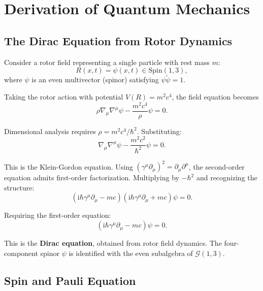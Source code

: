 \documentclass[11pt,a4paper]{article}
\numberwithin{equation}{section}
\theoremstyle{plain}
\theoremstyle{definition}
\theoremstyle{remark}
\newcommand{\Cl}{\mathcal{G}}               %
\newcommand{\rev}[1]{\widetilde{#1}}       %
\newcommand{\Spin}{\mathrm{Spin}}
\newcommand{\ii}{\mathrm{i}}
\begin{document}
\section{Derivation of Quantum Mechanics}
\label{sec:quantum}

\subsection{The Dirac Equation from Rotor Dynamics}

Consider a rotor field representing a single particle with rest mass $m$:
\begin{equation}
R(x,t) = \psi(x,t) \in \Spin(1,3),
\end{equation}
where $\psi$ is an even multivector (spinor) satisfying $\psi\rev{\psi} = 1$.

Taking the rotor action with potential $V(R) = m^2c^4$, the field equation becomes
\begin{equation}
\rho\nabla_\mu\nabla^\mu\psi - \frac{m^2c^4}{\rho}\psi = 0.
\end{equation}

Dimensional analysis requires $\rho = m^2c^4/\hbar^2$. Substituting:
\begin{equation}
\nabla_\mu\nabla^\mu\psi - \frac{m^2c^2}{\hbar^2}\psi = 0.
\end{equation}

This is the Klein-Gordon equation. Using $(\gamma^\mu\partial_\mu)^2 = \partial_\mu\partial^\mu$, the second-order equation admits first-order factorization. Multiplying by $-\hbar^2$ and recognizing the structure:
\begin{equation}
(\ii\hbar\gamma^\mu\partial_\mu - mc)(\ii\hbar\gamma^\mu\partial_\mu + mc)\psi = 0.
\end{equation}

Requiring the first-order equation:
\begin{equation}
\boxed{(\ii\hbar\gamma^\mu\partial_\mu - mc)\psi = 0.}
\label{eq:dirac-derived}
\end{equation}

This is the \textbf{Dirac equation}, obtained from rotor field dynamics. The four-component spinor $\psi$ is identified with the even subalgebra of $\Cl(1,3)$.

\subsection{Spin and Pauli Equation}
\end{document}
